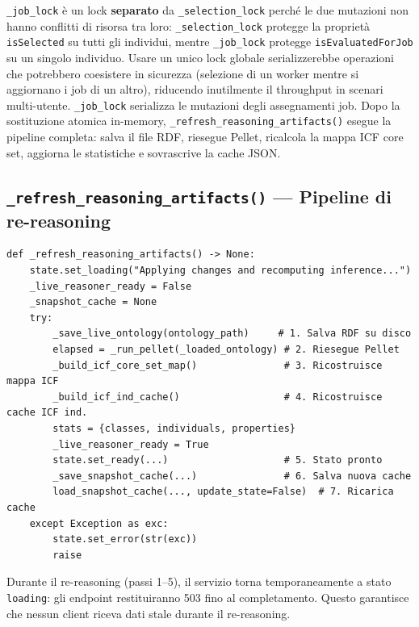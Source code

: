 \documentclass[a4paper,12pt]{article}
\begin{document}
\noindent \texttt{\_job\_lock} \`{e} un lock \textbf{separato} da
\texttt{\_selection\_lock} perch\'{e} le due mutazioni non hanno conflitti
di risorsa tra loro: \texttt{\_selection\_lock} protegge la propriet\`{a}
\texttt{isSelected} su tutti gli individui, mentre \texttt{\_job\_lock}
protegge \texttt{isEvaluatedForJob} su un singolo individuo. Usare un
unico lock globale serializzerebbe operazioni che potrebbero coesistere
in sicurezza (selezione di un worker mentre si aggiornano i job di un
altro), riducendo inutilmente il throughput in scenari multi-utente.
\texttt{\_job\_lock} serializza le mutazioni degli assegnamenti job.
Dopo la sostituzione atomica in-memory, \texttt{\_\allowbreak{}refresh\_\allowbreak{}reasoning\_\allowbreak{}artifacts()}
esegue la pipeline completa: salva il file RDF, riesegue Pellet,
ricalcola la mappa ICF core set, aggiorna le statistiche e sovrascrive
la cache JSON.

\subsection{\texttt{\_\allowbreak{}refresh\_\allowbreak{}reasoning\_\allowbreak{}artifacts()} --- Pipeline di re-reasoning}

\begin{lstlisting}[caption={Sequenza di re-reasoning dopo una mutazione.}]
def _refresh_reasoning_artifacts() -> None:
    state.set_loading("Applying changes and recomputing inference...")
    _live_reasoner_ready = False
    _snapshot_cache = None
    try:
        _save_live_ontology(ontology_path)     # 1. Salva RDF su disco
        elapsed = _run_pellet(_loaded_ontology) # 2. Riesegue Pellet
        _build_icf_core_set_map()               # 3. Ricostruisce mappa ICF
        _build_icf_ind_cache()                  # 4. Ricostruisce cache ICF ind.
        stats = {classes, individuals, properties}
        _live_reasoner_ready = True
        state.set_ready(...)                    # 5. Stato pronto
        _save_snapshot_cache(...)               # 6. Salva nuova cache
        load_snapshot_cache(..., update_state=False)  # 7. Ricarica cache
    except Exception as exc:
        state.set_error(str(exc))
        raise
\end{lstlisting}

\noindent Durante il re-reasoning (passi 1--5), il servizio torna temporaneamente
a stato \texttt{loading}: gli endpoint restituiranno 503 fino al
completamento. Questo garantisce che nessun client riceva dati stale
durante il re-reasoning.
\end{document}
